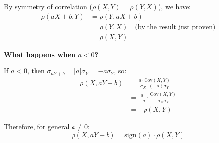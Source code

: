 \documentclass[12pt]{article}
\begin{document}
\begin{solution}
By symmetry of correlation (\(\rho(X, Y) = \rho(Y, X)\)), we have:
\begin{align*}
\rho(aX + b, Y) &= \rho(Y, aX + b) \\
&= \rho(Y, X) \quad \text{(by the result just proven)} \\
&= \rho(X, Y)
\end{align*}

\textbf{What happens when \(a < 0\)?}

If \(a < 0\), then \(\sigma_{aY+b} = |a|\sigma_Y = -a\sigma_Y\), so:
\begin{align*}
\rho(X, aY + b) &= \frac{a \cdot \text{Cov}(X, Y)}{\sigma_X \cdot (-a)\sigma_Y} \\
&= \frac{a}{-a} \cdot \frac{\text{Cov}(X, Y)}{\sigma_X \sigma_Y} \\
&= -\rho(X, Y)
\end{align*}

Therefore, for general \(a \neq 0\):
\[
\boxed{\rho(X, aY + b) = \text{sign}(a) \cdot \rho(X, Y)}
\]
\end{solution}
\end{document}
